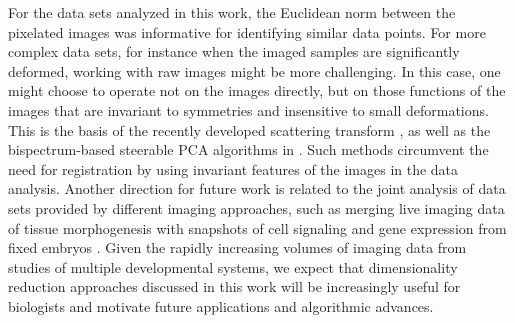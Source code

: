 \documentclass{pnastwo}
\begin{document}
\begin{article}
For the data sets analyzed in this work, the Euclidean norm between the pixelated images was informative for identifying similar data points. 
%
For more complex data sets, for instance when the imaged samples are significantly deformed, working with raw images might be more challenging.   
%
In this case, one might choose to operate not on the images directly, but on those functions of the images that are invariant to symmetries and insensitive to small deformations.  
%
This is the basis of the recently developed scattering transform \cite{mallat2012group}, as well as the bispectrum-based steerable PCA algorithms in \cite{zhao2014rotationally}. 
%
Such methods circumvent the need for registration by using invariant features of the images in the data analysis.
%
Another direction for future work is related to the joint analysis of data sets provided by different imaging approaches, such as merging live imaging data of tissue morphogenesis with snapshots of cell signaling and gene expression from fixed embryos \cite{krzic2012multiview, ichikawa2014live, rubel2010coupling}. 
%
Given the rapidly increasing volumes of imaging data from studies of multiple developmental systems, we expect that dimensionality reduction approaches discussed in this work will be increasingly useful for biologists and motivate future applications and algorithmic advances. 



%
%
%
%
  




\end{article}
\end{document}
